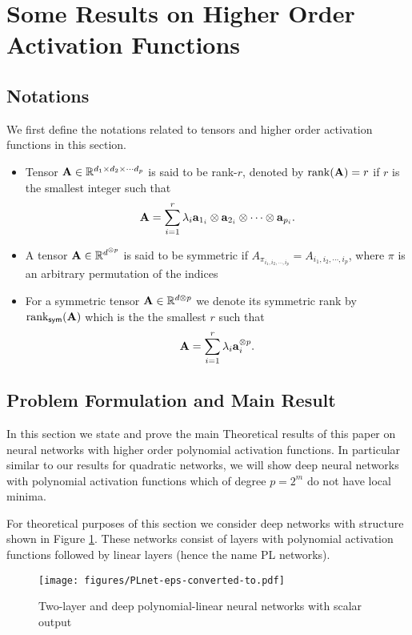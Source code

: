 \documentclass[11pt]{article}
\theoremstyle{plain}
\DeclareMathOperator*{\rank}{rank}
\DeclareMathOperator*{\symrank}{rank_{\sf sym}}
\def\R{\mathbb{R}}
\theoremstyle{plain}
\numberwithin{equation}{section}
\numberwithin{lemma}{section}
\numberwithin{theorem}{section}
\numberwithin{corollary}{section}
\numberwithin{observation}{section}
\numberwithin{definition}{section}
\numberwithin{example}{section}
\begin{document}
 \label{app:poly}
\section{Some Results on Higher Order Activation Functions} \label{sec:polynomial}
\renewcommand{\theequation}{\Alph{section}.\arabic{equation}}
\renewcommand{\thefigure}{\Alph{section}.\arabic{figure}}


\subsection{Notations}
We first define the notations related to tensors and higher order activation functions in this section.

\begin{itemize}
\item Tensor $\Mx{A} \in \R^{d_1 \times d_2 \times \cdots d_p}$ is said to be rank-$r$, denoted by $\rank(\Mx{A}) = r$ if $r$ is the smallest integer such that
    \[
    \Mx{A} = \sum_{i = 1}^r \lambda_i \V{a}_{1_i} \otimes \V{a}_{2_i} \otimes \cdots \otimes \V{a}_{p_i}.
    \]
    \item A tensor $\Mx{A} \in \R^{d^{\otimes p}}$ is said to be symmetric if $A_{\pi_{i_1,i_2,\cdots,i_p}} = A_{i_1,i_2,\cdots,i_p}$, where $\pi$ is an arbitrary permutation of the indices
    \item For a symmetric tensor $\Mx{A} \in \R^{d {\otimes p}}$ we denote its symmetric rank by $\symrank(\Mx{A})$ which is the the smallest $r$ such that
    \[
    \Mx{A} = \sum_{i=1}^r \lambda_i \V{a}_i^{\otimes p}.
    \]
\end{itemize}

\subsection{Problem Formulation and Main Result}
In this section we state and prove the main Theoretical results of this paper on neural networks with higher order polynomial activation functions. In particular similar to our results for quadratic networks, we will show deep neural networks with polynomial activation functions which of degree $p = 2^m$ do not have local minima. 

For theoretical purposes of this section we consider deep networks with structure shown in Figure \ref{fig:PLnet}. These networks consist of layers with polynomial activation functions followed by linear layers (hence the name PL networks).

\begin{figure}[H]
\begin{center}
\noindent
\texttt{[image: figures/PLnet-eps-converted-to.pdf]}
\caption{Two-layer and deep polynomial-linear neural networks with scalar output}
\label{fig:PLnet}
\end{center}
\end{figure}
\end{document}
